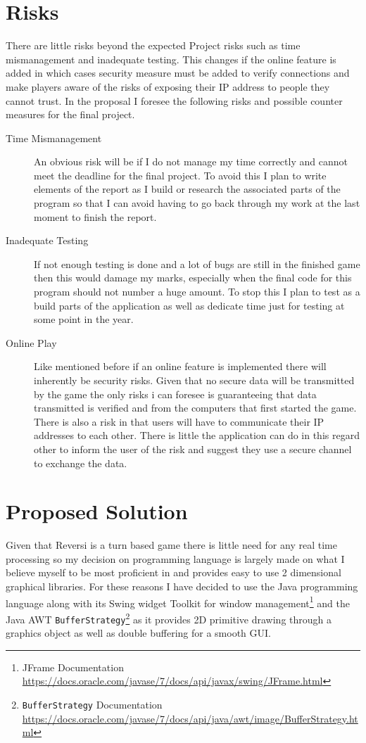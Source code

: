 \documentclass[proposal]{cmpreport}
\begin{document}
\section{Risks} \label{Risks}
There are little risks beyond the expected Project risks such as time mismanagement and inadequate testing. This changes if the online feature is added in which cases security measure must be added to verify connections and make players aware of the risks of exposing their IP address to people they cannot trust. In the proposal I foresee the following risks and possible counter measures for the final project.
\begin{description}
	\item[Time Mismanagement] An obvious risk will be if I do not manage my time correctly and cannot meet the deadline for the final project. To avoid this I plan to write elements of the report as I build or research the associated parts of the program so that I can avoid having to go back through my work at the last moment to finish the report.
	\item[Inadequate Testing]
	If not enough testing is done and a lot of bugs are still in the finished game then this would damage my marks, especially when the final code for this program should not number a huge amount.
	To stop this I plan to test as a build parts of the application as well as dedicate time just for testing at some point in the year.
	\item[Online Play] Like mentioned before if an online feature is implemented there will inherently be security risks. Given that no secure data will be transmitted by the game the only risks i can foresee is guaranteeing that data transmitted is verified and from the computers that first started the game. There is also a risk in that users will have to communicate their IP addresses to each other. There is little the application can do in this regard other to inform the user of the risk and suggest they use a secure channel to exchange the data.
\end{description}
\section{Proposed Solution}
Given that Reversi is a turn based game there is little need for any real time processing so my decision on programming language is largely made on what I believe myself to be most proficient in and provides easy to use 2 dimensional graphical libraries. For these reasons I have decided to use the Java programming language along with its Swing widget Toolkit for window management\footnote{JFrame Documentation \url{https://docs.oracle.com/javase/7/docs/api/javax/swing/JFrame.html}} and the Java AWT \texttt{BufferStrategy}\footnote{\texttt{BufferStrategy} Documentation \url{https://docs.oracle.com/javase/7/docs/api/java/awt/image/BufferStrategy.html}} as it provides 2D primitive drawing through a graphics object as well as double buffering for a smooth GUI.
\end{document}
